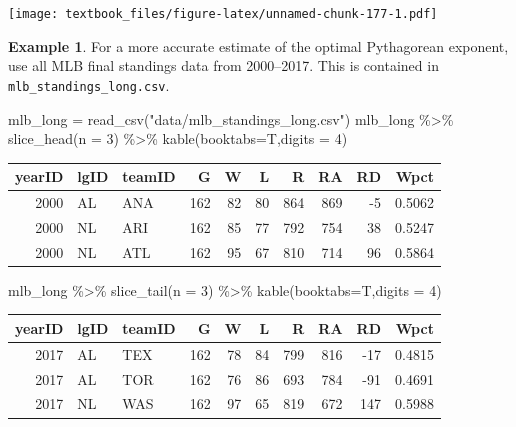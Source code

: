 \documentclass[
  11pt,
]{book}
\newenvironment{Shaded}{\begin{snugshade}}{\end{snugshade}}
\newcommand{\AttributeTok}[1]{\textcolor[rgb]{0.77,0.63,0.00}{#1}}
\newcommand{\DecValTok}[1]{\textcolor[rgb]{0.00,0.00,0.81}{#1}}
\newcommand{\FunctionTok}[1]{\textcolor[rgb]{0.00,0.00,0.00}{#1}}
\newcommand{\NormalTok}[1]{#1}
\newcommand{\OtherTok}[1]{\textcolor[rgb]{0.56,0.35,0.01}{#1}}
\newcommand{\SpecialCharTok}[1]{\textcolor[rgb]{0.00,0.00,0.00}{#1}}
\newcommand{\StringTok}[1]{\textcolor[rgb]{0.31,0.60,0.02}{#1}}
\theoremstyle{definition}
\theoremstyle{definition}
\newtheorem{example}{Example}[chapter]
\theoremstyle{definition}
\theoremstyle{definition}
\theoremstyle{remark}
\begin{document}
\texttt{[image: textbook\_files/figure-latex/unnamed-chunk-177-1.pdf]}

\newpage

\begin{example}
For a more accurate estimate of the optimal Pythagorean exponent, use all MLB final standings data from 2000--2017. This is contained in \texttt{mlb\_standings\_long.csv}.
\end{example}

\begin{Shaded}
\begin{Highlighting}[]
\NormalTok{mlb\_long }\OtherTok{=} \FunctionTok{read\_csv}\NormalTok{(}\StringTok{"data/mlb\_standings\_long.csv"}\NormalTok{)}
\NormalTok{mlb\_long }\SpecialCharTok{\%\textgreater{}\%} \FunctionTok{slice\_head}\NormalTok{(}\AttributeTok{n =} \DecValTok{3}\NormalTok{) }\SpecialCharTok{\%\textgreater{}\%} \FunctionTok{kable}\NormalTok{(}\AttributeTok{booktabs=}\NormalTok{T,}\AttributeTok{digits =} \DecValTok{4}\NormalTok{)}
\end{Highlighting}
\end{Shaded}

\begin{tabular}{rllrrrrrrr}
\toprule
yearID & lgID & teamID & G & W & L & R & RA & RD & Wpct\\
\midrule
2000 & AL & ANA & 162 & 82 & 80 & 864 & 869 & -5 & 0.5062\\
2000 & NL & ARI & 162 & 85 & 77 & 792 & 754 & 38 & 0.5247\\
2000 & NL & ATL & 162 & 95 & 67 & 810 & 714 & 96 & 0.5864\\
\bottomrule
\end{tabular}

\begin{Shaded}
\begin{Highlighting}[]
\NormalTok{mlb\_long }\SpecialCharTok{\%\textgreater{}\%} \FunctionTok{slice\_tail}\NormalTok{(}\AttributeTok{n =} \DecValTok{3}\NormalTok{) }\SpecialCharTok{\%\textgreater{}\%} \FunctionTok{kable}\NormalTok{(}\AttributeTok{booktabs=}\NormalTok{T,}\AttributeTok{digits =} \DecValTok{4}\NormalTok{)}
\end{Highlighting}
\end{Shaded}

\begin{tabular}{rllrrrrrrr}
\toprule
yearID & lgID & teamID & G & W & L & R & RA & RD & Wpct\\
\midrule
2017 & AL & TEX & 162 & 78 & 84 & 799 & 816 & -17 & 0.4815\\
2017 & AL & TOR & 162 & 76 & 86 & 693 & 784 & -91 & 0.4691\\
2017 & NL & WAS & 162 & 97 & 65 & 819 & 672 & 147 & 0.5988\\
\bottomrule
\end{tabular}
\end{document}
